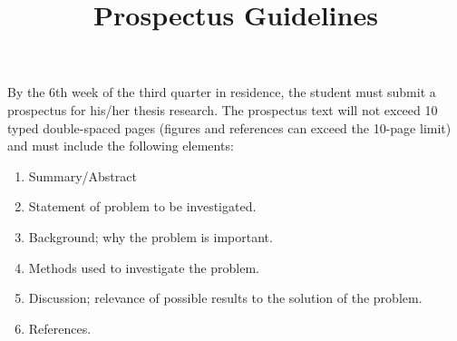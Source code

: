 \documentclass[11pt]{article}
\title{\textbf{Prospectus Guidelines}}
\date{}
\begin{document}
\maketitle

By the 6th week of the third quarter in residence, the student must submit a prospectus
for his/her thesis research. The prospectus text will not exceed 10 typed double-spaced pages (figures
and references can exceed the 10-page limit) and must include the following elements:

\begin{enumerate}
  \item Summary/Abstract
  \item Statement of problem to be investigated.
  \item Background; why the problem is important.
  \item Methods used to investigate the problem.
  \item Discussion; relevance of possible results to the solution of the problem.
  \item References.
\end{enumerate}
\end{document}
